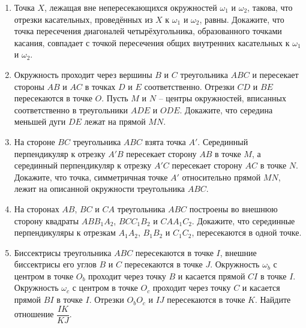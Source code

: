 \documentclass{article}
\begin{document}
\begin{enumerate}[label*=\protect\fbox{\arabic{enumi}}]
\item Точка $X$, лежащая вне непересекающихся окружностей $\omega_1$ и $\omega_2$, такова, что отрезки касательных, проведённых из $X$ к $\omega_1$ и $\omega_2$, равны. Докажите, что точка пересечения диагоналей четырёхугольника, образованного точками касания, совпадает с точкой пересечения общих внутренних касательных к $\omega_1$ и $\omega_2$.

\item Окружность проходит через вершины $B$ и $C$ треугольника $ABC$ и пересекает стороны $AB$ и $AC$ в точках $D$ и $E$ соответственно. Отрезки $CD$ и $BE$ пересекаются в точке $O$. Пусть $M$ и $N$ – центры окружностей, вписанных соответственно в треугольники $ADE$ и $ODE$. Докажите, что середина меньшей дуги $DE$ лежат на прямой $MN$.

\item На стороне $BC$ треугольника $ABC$ взята точка $A'$. Серединный перпендикуляр к отрезку $A'B$ пересекает сторону $AB$ в точке $M$, а серединный перпендикуляр к отрезку $A'C$ пересекает сторону $AC$ в точке $N$. Докажите, что точка, симметричная точке $A'$ относительно прямой $MN$, лежит на описанной окружности треугольника $ABC$. 

\item На сторонах $AB$, $BC$ и $CA$ треугольника $ABC$ построены во внешнюю сторону квадраты $ABB_1A_2$, $BCC_1B_2$ и $CAA_1C_2$. 
Докажите, что серединные перпендикуляры к отрезкам $A_1A_2$, $B_1B_2$ и $C_1C_2$, пересекаются в одной точке.

\item Биссектрисы треугольника $ABC$ пересекаются в точке $I$, внешние биссектрисы его углов $B$ и $C$ пересекаются в точке $J$. Окружность $\omega_b$ с центром в точке $O_b$ проходит через точку $B$ и касается прямой $CI$ в точке $I$. Окружность $\omega_c$ с центром в точке $O_c$ проходит через точку $C$ и касается прямой $BI$ в точке $I$. Отрезки $O_bO_c$ и $IJ$ пересекаются в точке $K$. Найдите отношение
$\dfrac{IK}{KJ}$.



\end{enumerate}
\end{document}

